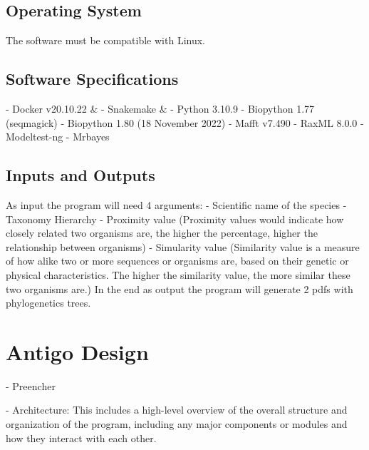 \documentclass[12pt]{article}
\begin{document}
\subsection{Operating System}
The software must be compatible with Linux.
\subsection{Software Specifications}
- Docker v20.10.22 \& \newline
- Snakemake \& \newline
- Python 3.10.9\newline
- Biopython 1.77 (seqmagick)\newline 
- Biopython 1.80 (18 November 2022)\newline
- Mafft v7.490 \newline
- RaxML 8.0.0 \newline
- Modeltest-ng \newline
- Mrbayes\newline
\newpage

\subsection{Inputs and Outputs}
As input the program will need 4 arguments: - Scientific name of the species - Taxonomy Hierarchy - Proximity value (Proximity values would indicate how closely related two organisms are, the higher the percentage, higher the relationship between organisms) - Simularity value (Similarity value is a measure of how alike two or more sequences or organisms are, based on their genetic or physical characteristics. The higher the similarity value, the more similar these two organisms are.)\newline
In the end as output the program will generate 2 pdfs with phylogenetics trees.
    
\section{Antigo Design}\label{sec:desenvolvimentos}
- Preencher

- Architecture: This includes a high-level overview of the overall structure and organization of the program, including any major components or modules and how they interact with each other.
\end{document}

